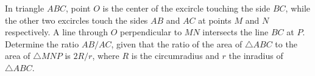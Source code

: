 In triangle $ABC$, point $O$ is the center of the excircle touching the side $BC$, while the other two excircles touch the sides $AB$ and $AC$ at points $M$ and $N$ respectively. A line through $O$ perpendicular to $MN$ intersects the line $BC$ at $P$. Determine the ratio $AB/AC$, given that the ratio of the area of $\triangle ABC$ to the area of $\triangle MNP$ is $2R/r$, where $R$ is the circumradius and $r$ the inradius of $\triangle ABC$.